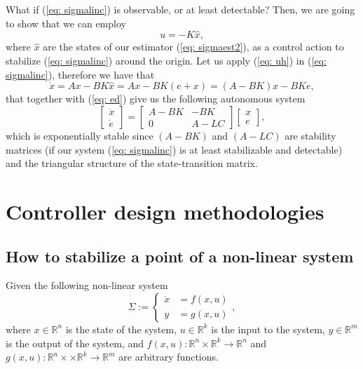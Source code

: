 \documentclass[11pt,a4paper,titlepage]{article}
\begin{document}
What if (\ref{eq: sigmalinc}) is observable, or at least detectable? Then, we are going to show that we can employ
\begin{equation}
	u = -K \hat x, \label{eq: uh}
\end{equation}
where $\hat x$ are the states of our estimator (\ref{eq: sigmaest2}), as a control action to stabilize (\ref{eq: sigmalinc}) around the origin. Let us apply (\ref{eq: uh}) in (\ref{eq: sigmalinc}), therefore we have that
\begin{equation}
	\dot x = Ax - BK\hat x = Ax - BK(e + x) = (A -BK)x -BKe,
\end{equation}
that together with (\ref{eq: ed}) give us the following autonomous system
\begin{equation}
	\begin{bmatrix}\dot x \\ \dot e\end{bmatrix} = \begin{bmatrix}A-BK & -BK \\ 0 & A-LC\end{bmatrix}\begin{bmatrix}x \\ e\end{bmatrix},
\end{equation}
which is exponentially stable since $(A-BK)$ and $(A-LC)$ are stability matrices (if our system (\ref{eq: sigmalinc}) is at least stabilizable and detectable) and the triangular structure of the state-transition matrix.

\section{Controller design methodologies}
\subsection{How to stabilize a point of a non-linear system}
Given the following non-linear system
\begin{equation}
	\Sigma :=
\begin{cases}
	\dot x &= f(x,u) \\
	y &= g(x,u)
\end{cases},
\end{equation}
where $x\in\mathbb{R}^n$ is the state of the system, $u\in\mathbb{R}^k$ is the input to the system, $y\in\mathbb{R}^m$ is the output of the system, and $f(x,u): \mathbb{R}^n\times\mathbb{R}^k \to \mathbb{R}^n$ and $g(x,u): \mathbb{R}^n\times \times\mathbb{R}^k \to \mathbb{R}^m$ are arbitrary functions.
\end{document}
